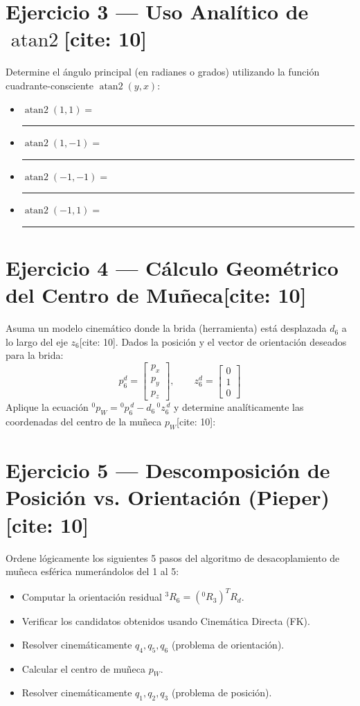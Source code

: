 \documentclass[11pt, a4paper]{article}
\begin{document}
\section*{Ejercicio 3 — Uso Analítico de $\operatorname{atan2}$[cite: 10]}
Determine el ángulo principal (en radianes o grados) utilizando la función cuadrante-consciente $\operatorname{atan2}(y, x)$:
\begin{itemize}
    \item $\operatorname{atan2}(1, 1) =$ \rule{2cm}{0.15mm}
    \item $\operatorname{atan2}(1, -1) =$ \rule{2cm}{0.15mm}
    \item $\operatorname{atan2}(-1, -1) =$ \rule{2cm}{0.15mm}
    \item $\operatorname{atan2}(-1, 1) =$ \rule{2cm}{0.15mm}
\end{itemize}

\section*{Ejercicio 4 — Cálculo Geométrico del Centro de Muñeca[cite: 10]}
Asuma un modelo cinemático donde la brida (herramienta) está desplazada $d_6$ a lo largo del eje $z_6$[cite: 10]. Dados la posición y el vector de orientación deseados para la brida:
\begin{equation*}
    p_6^d = \begin{bmatrix} p_x \\ p_y \\ p_z \end{bmatrix}, \qquad z_6^d = \begin{bmatrix} 0 \\ 1 \\ 0 \end{bmatrix}
\end{equation*}
Aplique la ecuación ${}^{0}p_W = {}^{0}p_6^{\,d} - d_6\,{}^{0}z_6^{\,d}$ y determine analíticamente las coordenadas del centro de la muñeca $p_W$[cite: 10]:
\vspace{3cm}

\section*{Ejercicio 5 — Descomposición de Posición vs. Orientación (Pieper)[cite: 10]}
Ordene lógicamente los siguientes 5 pasos del algoritmo de desacoplamiento de muñeca esférica numerándolos del 1 al 5:
\begin{itemize}
    \item[\rule{1cm}{0.15mm}] Computar la orientación residual ${}^3R_6 = ({}^0R_3)^T R_d$.
    \item[\rule{1cm}{0.15mm}] Verificar los candidatos obtenidos usando Cinemática Directa (FK).
    \item[\rule{1cm}{0.15mm}] Resolver cinemáticamente $q_4, q_5, q_6$ (problema de orientación).
    \item[\rule{1cm}{0.15mm}] Calcular el centro de muñeca $p_W$.
    \item[\rule{1cm}{0.15mm}] Resolver cinemáticamente $q_1, q_2, q_3$ (problema de posición).
\end{itemize}
\end{document}

